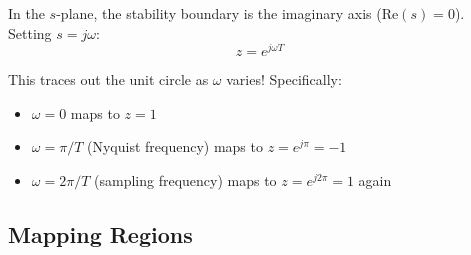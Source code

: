 In the $s$-plane, the stability boundary is the imaginary axis ($\text{Re}(s) = 0$). Setting $s = j\omega$:
\begin{equation}
z = e^{j\omega T}
\end{equation}

This traces out the unit circle as $\omega$ varies! Specifically:
\begin{itemize}
    \item $\omega = 0$ maps to $z = 1$
    \item $\omega = \pi/T$ (Nyquist frequency) maps to $z = e^{j\pi} = -1$
    \item $\omega = 2\pi/T$ (sampling frequency) maps to $z = e^{j2\pi} = 1$ again
\end{itemize}


\subsection{Mapping Regions}

